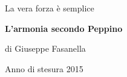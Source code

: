 \begin{titlepage} 

\begin{center}
{\huge {La vera forza è semplice}}
\end{center}{\huge}
\begin{center}
{\huge \vspace{4mm}}
\begin{figure}[!h]
\end{figure}
\end{center}{\huge \par}



\vspace{3.5 cm}
\begin{center}
\Huge\textbf{{ L'armonia secondo Peppino}}
\end{center}
\vspace{3 mm}
\begin{center}
di Giuseppe Fasanella
\end{center}


\vspace{6 cm}
\begin{center}
Anno di stesura 2015
\end{center}


\end{titlepage}
